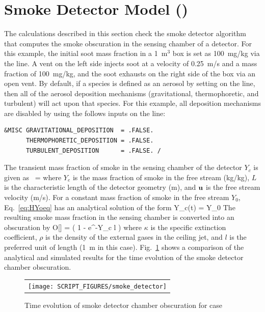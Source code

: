 \documentclass[11pt]{book}
\begin{document}
\section{Smoke Detector Model (\texorpdfstring{}{smoke\_detector}) }
\label{smoke_detector}

The calculations described in this section check the smoke detector algorithm that computes the smoke obscuration in the sensing chamber of a detector. For this example, the initial soot mass fraction in a 1~m$^3$ box is set as 100~mg/kg via the  line. A vent on the left side injects soot at a velocity of 0.25~m/s and a mass fraction of 100~mg/kg, and the soot exhausts on the right side of the box via an open vent. By default, if a species is defined as an aerosol by setting  on the  line, then all of the aerosol deposition mechanisms (gravitational, thermophoretic, and turbulent) will act upon that species. For this example, all deposition mechanisms are disabled by using the follows inputs on the  line:

\begin{lstlisting}
&MISC GRAVITATIONAL_DEPOSITION  = .FALSE.
      THERMOPHORETIC_DEPOSITION = .FALSE.
      TURBULENT_DEPOSITION      = .FALSE. /
\end{lstlisting}

\noindent The transient mass fraction of smoke in the sensing chamber of the detector $Y_c$ is given as~\cite{FDS_Tech_Guide}
\be
{} =  \label{eq:HYoeq}
\ee
where $Y_e$ is the mass fraction of smoke in the free stream (kg/kg), $L$ is the characteristic length of the detector geometry (m), and ${\mathbf{u}}$ is the free stream velocity (m/s). For a constant mass fraction of smoke in the free stream $Y_0$, Eq.~\ref{eq:HYoeq} has an analytical solution of the form
\be
Y_c(t) = Y_0 
\ee
The resulting smoke mass fraction in the sensing chamber is converted into an obscuration by
\be
O[] = \left( 1 - e^{-\kappa \rho Y_c l} \right) 
\ee
where $\kappa$ is the specific extinction coefficient, $\rho$ is the density of the external gases in the ceiling jet,
and $l$ is the preferred unit of length (1~m in this case).
Fig.~\ref{fig:smoke_detector} shows a comparison of the analytical and simulated results for the time evolution of the smoke detector chamber obscuration.

\begin{figure}[ht]
\centering
\begin{tabular}{c}
\texttt{[image: SCRIPT\_FIGURES/smoke\_detector]}
\end{tabular}
\caption[Smoke detector chamber obscuration for  case]{Time evolution of smoke detector chamber obscuration for  case}
\label{fig:smoke_detector}
\end{figure}
\end{document}
